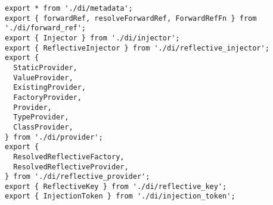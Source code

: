 \begin{verbatim}
export * from './di/metadata';
export { forwardRef, resolveForwardRef, ForwardRefFn } from './di/forward_ref';
export { Injector } from './di/injector';
export { ReflectiveInjector } from './di/reflective_injector';
export {
  StaticProvider,
  ValueProvider,
  ExistingProvider,
  FactoryProvider,
  Provider,
  TypeProvider,
  ClassProvider,
} from './di/provider';
export {
  ResolvedReflectiveFactory,
  ResolvedReflectiveProvider,
} from './di/reflective_provider';
export { ReflectiveKey } from './di/reflective_key';
export { InjectionToken } from './di/injection_token';
\end{verbatim}
